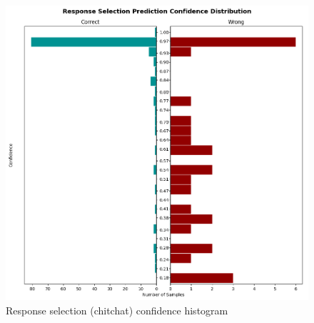 \documentclass[journal, 11pt]{IEEEtran}
\begin{document}
\begin{figure}[ht]
    \centering
    \includegraphics[width=\textwidth]{figures/response_selection_histogram.png}
    \caption{Response selection (chitchat) confidence histogram}
    \label{fig:resp-sel-hist}
\end{figure}


\ifCLASSOPTIONcaptionsoff
  \newpage
\fi
\end{document}
